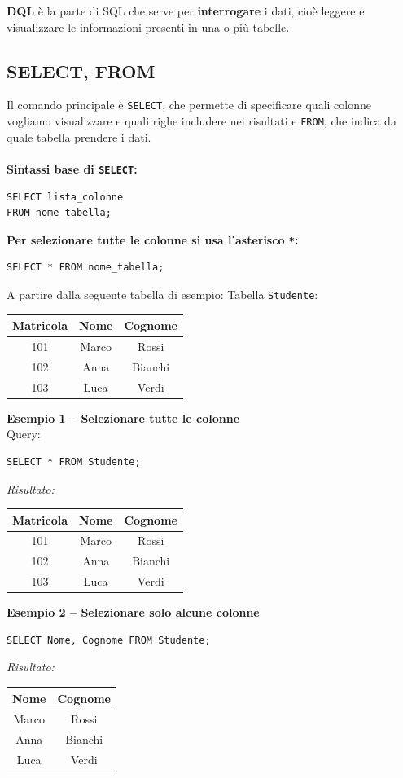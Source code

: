\documentclass[a4paper,12pt]{article}
\newcommand{\code}[1]{\texttt{#1}}
\begin{document}
\textbf{DQL} è la parte di SQL che serve per \textbf{interrogare} i dati, cioè leggere e visualizzare le informazioni presenti in una o più tabelle.  

\subsection{SELECT, FROM}
Il comando principale è \code{SELECT}, che permette di specificare quali colonne vogliamo visualizzare e quali righe includere nei risultati e \code{FROM}, che indica da quale tabella prendere i dati.\\\\
\textbf{Sintassi base di \code{SELECT}:}
\begin{verbatim}
SELECT lista_colonne
FROM nome_tabella;
\end{verbatim}
\textbf{Per selezionare tutte le colonne si usa l'asterisco \code{*}:}
\begin{verbatim}
SELECT * FROM nome_tabella;
\end{verbatim}
A partire dalla seguente tabella di esempio:
Tabella \texttt{Studente}:
\begin{center}
\begin{tabular}{|c|c|c|}
\hline
\textbf{Matricola} & \textbf{Nome} & \textbf{Cognome} \\
\hline
101 & Marco & Rossi \\
102 & Anna & Bianchi \\
103 & Luca & Verdi \\
\hline
\end{tabular}
\end{center}
\bigskip
\textbf{Esempio 1 -- Selezionare tutte le colonne}\\
Query:
\begin{verbatim}
SELECT * FROM Studente;
\end{verbatim}
\textit{Risultato:}
\begin{center}
\begin{tabular}{|c|c|c|}
\hline
Matricola & Nome & Cognome \\
\hline
101 & Marco & Rossi \\
102 & Anna & Bianchi \\
103 & Luca & Verdi \\
\hline
\end{tabular}
\end{center}
\bigskip
\textbf{Esempio 2 -- Selezionare solo alcune colonne}
\begin{verbatim}
SELECT Nome, Cognome FROM Studente;
\end{verbatim}
\textit{Risultato:}
\begin{center}
\begin{tabular}{|c|c|}
\hline
Nome & Cognome \\
\hline
Marco & Rossi \\
Anna & Bianchi \\
Luca & Verdi \\
\hline
\end{tabular}
\end{center}
\end{document}
